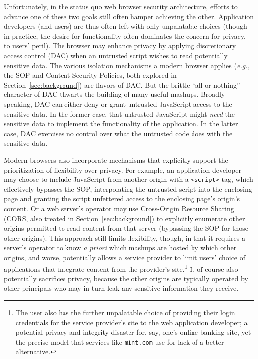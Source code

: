 Unfortunately, in the status quo web browser security architecture,
efforts to advance one of these two goals still often hamper achieving
the other. Application developers (and users) are thus often left with
only unpalatable choices (though in practice, the desire for
functionality often dominates the concern for privacy, to users'
peril). The browser may enhance privacy by applying discretionary
access control (DAC) when an untrusted script wishes to read
potentially sensitive data. The various isolation mechanisms a modern
browser applies ({\em e.g.,} the SOP and Content Security Policies,
both explored in Section~\ref{sec:background}) are flavors of DAC. But
the brittle ``all-or-nothing'' character of DAC thwarts the building
of many useful mashups. Broadly speaking, DAC can either deny or grant
untrusted JavaScript access to the sensitive data. In the former case,
that untrusted JavaScript might {\em need} the sensitive data to
implement the functionality of the application. In the latter case,
DAC exercises no control over what the untrusted code does with the
sensitive data.

Modern browsers also incorporate mechanisms that explicitly support
the prioritization of flexibility over privacy. For example, an
application developer may choose to include JavaScript from another
origin with a {\tt <script>} tag, which effectively bypasses the SOP,
interpolating the untrusted script into the enclosing page and
granting the script unfettered access to the enclosing page's origin's
content. Or a web server's operator may use Cross-Origin Resource
Sharing (CORS, also treated in Section~\ref{sec:background}) to
explicitly enumerate other origins permitted to read content from that
server (bypassing the SOP for those other origins). This approach
still limits flexibility, though, in that it requires a server's
operator to know {\em a priori} which mashups are hosted by which
other origins, and worse, potentially allows a service provider to
limit users' choice of applications that integrate content from the
provider's site.\footnote{The user also has the further unpalatable
  choice of providing their login credentials for the service
  provider's site to the web application developer; a potential
  privacy and integrity disaster for, say, one's online banking site,
  yet the precise model that services like {\tt mint.com} use for lack
  of a better alternative.} It of course also potentially sacrifices
privacy, because the other origins are typically operated by other
principals who may in turn leak any sensitive information they
receive.

